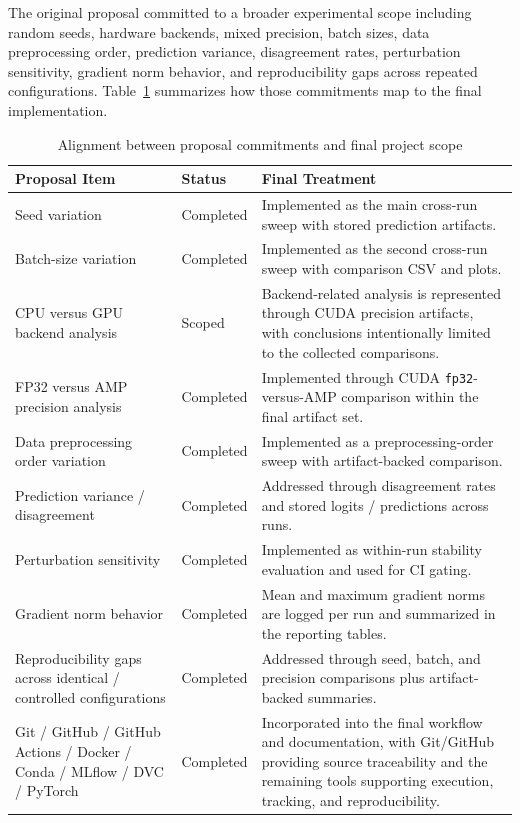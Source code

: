\documentclass[conference]{IEEEtran}
\begin{document}
The original proposal committed to a broader experimental scope including random seeds, hardware backends, mixed precision, batch sizes, data preprocessing order, prediction variance, disagreement rates, perturbation sensitivity, gradient norm behavior, and reproducibility gaps across repeated configurations. Table~\ref{tab:proposal_alignment} summarizes how those commitments map to the final implementation.

\begin{table}[t]
\centering
\caption{Alignment between proposal commitments and final project scope}
\label{tab:proposal_alignment}
\begin{tabular}{>{\raggedright\arraybackslash}p{}>{\raggedright\arraybackslash}p{}>{\raggedright\arraybackslash}p{}}
\toprule
Proposal Item & Status & Final Treatment \\
\midrule
Seed variation & Completed & Implemented as the main cross-run sweep with stored prediction artifacts. \\
Batch-size variation & Completed & Implemented as the second cross-run sweep with comparison CSV and plots. \\
CPU versus GPU backend analysis & Scoped & Backend-related analysis is represented through CUDA precision artifacts, with conclusions intentionally limited to the collected comparisons. \\
FP32 versus AMP precision analysis & Completed & Implemented through CUDA \texttt{fp32}-versus-AMP comparison within the final artifact set. \\
Data preprocessing order variation & Completed & Implemented as a preprocessing-order sweep with artifact-backed comparison. \\
Prediction variance / disagreement & Completed & Addressed through disagreement rates and stored logits / predictions across runs. \\
Perturbation sensitivity & Completed & Implemented as within-run stability evaluation and used for CI gating. \\
Gradient norm behavior & Completed & Mean and maximum gradient norms are logged per run and summarized in the reporting tables. \\
Reproducibility gaps across identical / controlled configurations & Completed & Addressed through seed, batch, and precision comparisons plus artifact-backed summaries. \\
Git / GitHub / GitHub Actions / Docker / Conda / MLflow / DVC / PyTorch & Completed & Incorporated into the final workflow and documentation, with Git/GitHub providing source traceability and the remaining tools supporting execution, tracking, and reproducibility. \\
\bottomrule
\end{tabular}
\end{table}
\end{document}
